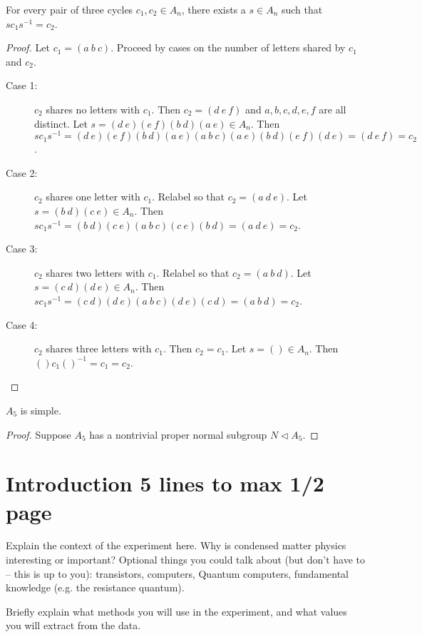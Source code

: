 \documentclass[a4paper]{article}
\begin{document}
\begin{theorem}
   For every pair of three cycles $c_1, c_2 \in A_n$, there exists a $s \in A_n$ such that $s c_1 s^{-1} = c_2$.
\end{theorem}
\begin{proof}
Let $c_1 = (a\ b\ c)$. Proceed by cases on the number of letters shared by $c_1$ and $c_2$.
\begin{description}
   \item[Case 1:]$c_2$ shares no letters with $c_1$.
   Then $c_2 = (d\ e\ f)$ and $a, b, c, d, e, f$ are all distinct. Let $s = (d\ e)(e\ f)(b\ d)(a\ e) \in A_n$. Then $s c_1 s^{-1} = (d\ e)(e\ f)(b\ d)(a\ e)(a\ b\ c)(a\ e)(b\ d)(e\ f)(d\ e) = (d\ e\ f) = c_2$.
   \item[Case 2:]$c_2$ shares one letter with $c_1$.
   Relabel so that $c_2 = (a\ d\ e)$. Let $s = (b\ d)(c\ e) \in A_n$. Then $s c_1 s^{-1} = (b\ d)(c\ e)(a\ b\ c)(c\ e)(b\ d) = (a\ d\ e) = c_2$.
   \item[Case 3:]$c_2$ shares two letters with $c_1$.
   Relabel so that $c_2 = (a\ b\ d)$. Let $s = (c\ d)(d\ e) \in A_n$. Then $s c_1 s^{-1} = (c\ d)(d\ e)(a\ b\ c)(d\ e)(c\ d) = (a\ b\ d) = c_2$.
   \item[Case 4:]$c_2$ shares three letters with $c_1$.
   Then $c_2 = c_1$. Let $s = () \in A_n$. Then $() c_1 ()^{-1} = c_1 = c_2$.
\end{description}
\end{proof}

\begin{theorem}
   $A_5$ is simple.
\end{theorem}
\begin{proof}
   Suppose $A_5$ has a nontrivial proper normal subgroup $N \triangleleft A_5$.
\end{proof}

\section{Introduction 5 lines to max 1/2 page}
\label{sec:introduction}

Explain the context of the experiment here. Why is condensed matter physics interesting or important?
Optional things you could talk about (but don't have to -- this is up to you): transistors, computers, Quantum computers, fundamental knowledge (e.g. the resistance quantum).

Briefly explain what methods you will use in the experiment, and what values you will extract from the data.
\end{document}
